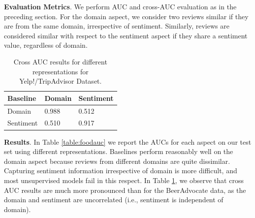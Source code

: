 \documentclass[11pt,a4paper]{article}
\begin{document}
\vspace{.2em}
\noindent \textbf{Evaluation Metrics}. We perform AUC and cross-AUC evaluation as in the preceding section. For the domain aspect, we consider two reviews similar if they are from the same domain, irrespective of sentiment. Similarly, reviews are considered similar with respect to the sentiment aspect if they share a sentiment value, regardless of domain.






\begin{table}[h]
\footnotesize
    \centering
    \begin{tabularx}{\columnwidth}{l X X}
     Baseline & Domain & Sentiment  \\
    \hline
    Domain & 0.988 & 0.512   \\
    Sentiment & 0.510 & 0.917  \\
    \end{tabularx}
    \vspace{-1em}
    \caption{Cross AUC results for different representations for Yelp!/TripAdvisor Dataset.}
    \vspace{-1.5em}
    \label{table:foodcrossauc}
\end{table}

\vspace{.25em}
\noindent  \textbf{Results}. In Table \ref{table:foodauc} we report the AUCs for each aspect on our test set using different representations. Baselines perform reasonably well on the domain aspect because reviews from different domains are quite dissimilar. Capturing sentiment information irrespective of domain is more difficult, and most unsupervised models fail in this respect. In Table \ref{table:foodcrossauc}, we observe that cross AUC results are much more pronounced than for the BeerAdvocate data, as the domain and sentiment are uncorrelated (i.e., sentiment is independent of domain).
\end{document}
